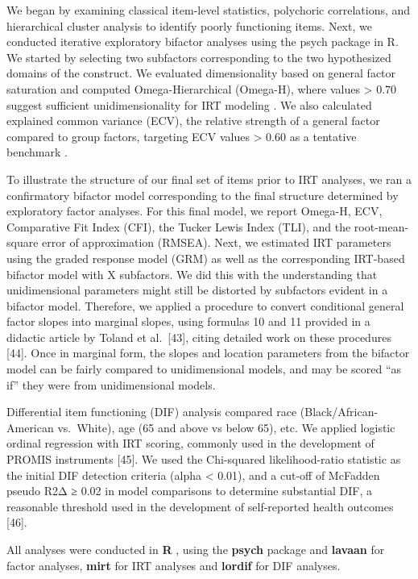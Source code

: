 \documentclass[
]{article}
\begin{document}
We began by examining classical item-level statistics, polychoric correlations, and hierarchical cluster analysis to identify poorly functioning items. Next, we conducted iterative exploratory bifactor analyses using the psych package in R. We started by selecting two subfactors corresponding to the two hypothesized domains of the construct. We evaluated dimensionality based on general factor saturation and computed Omega-Hierarchical (Omega-H), where values \textgreater{} 0.70 suggest sufficient unidimensionality for IRT modeling \citep{ReiseEtAl2013}. We also calculated explained common variance (ECV), the relative strength of a general factor compared to group factors, targeting ECV values \textgreater{} 0.60 as a tentative benchmark \citep{ReiseEtAl2013}.

To illustrate the structure of our final set of items prior to IRT analyses, we ran a confirmatory bifactor model corresponding to the final structure determined by exploratory factor analyses. For this final model, we report Omega-H, ECV, Comparative Fit Index (CFI), the Tucker Lewis Index (TLI), and the root-mean-square error of approximation (RMSEA). Next, we estimated IRT parameters using the graded response model (GRM) as well as the corresponding IRT-based bifactor model with X subfactors. We did this with the understanding that unidimensional parameters might still be distorted by subfactors evident in a bifactor model. Therefore, we applied a procedure to convert conditional general factor slopes into marginal slopes, using formulas 10 and 11 provided in a didactic article by Toland et al.~{[}43{]}, citing detailed work on these procedures {[}44{]}. Once in marginal form, the slopes and location parameters from the bifactor model can be fairly compared to unidimensional models, and may be scored ``as if'' they were from unidimensional models.

Differential item functioning (DIF) analysis compared race (Black/African-American vs.~White), age (65 and above vs below 65), etc. We applied logistic ordinal regression with IRT scoring, commonly used in the development of PROMIS instruments {[}45{]}. We used the Chi-squared likelihood-ratio statistic as the initial DIF detection criteria (alpha \textless{} 0.01), and a cut-off of McFadden pseudo R2Δ ≥ 0.02 in model comparisons to determine substantial DIF, a reasonable threshold used in the development of self-reported health outcomes {[}46{]}.

All analyses were conducted in \textbf{R} \citep{R-base}, using the \textbf{psych} package \citep{R-psych} and \textbf{lavaan} \citep{R-lavaan} for factor analyses, \textbf{mirt} \citep{R-mirt} for IRT analyses and \textbf{lordif} \citep{R-lordif} for DIF analyses.
\end{document}
